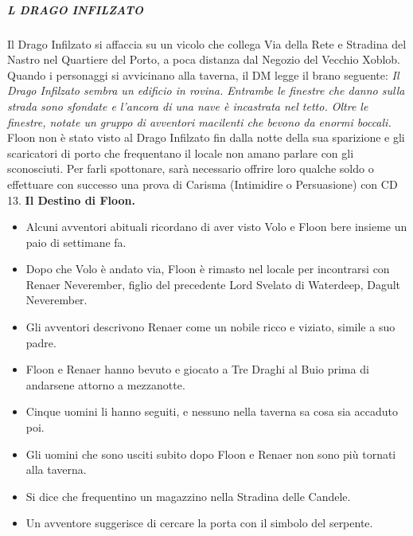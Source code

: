 \documentclass{article}
\begin{document}
                        \subparagraph{L DRAGO INFILZATO}
Il Drago Infilzato si affaccia su un vicolo che collega Via della Rete e Stradina del Nastro nel Quartiere del Porto, a poca distanza dal Negozio del Vecchio Xoblob. Quando i personaggi si avvicinano alla taverna, il DM legge il brano seguente:\newline
\textit{Il Drago Infilzato sembra un edificio in rovina. Entrambe le finestre che danno sulla strada sono sfondate e l'ancora di una nave è incastrata nel tetto. Oltre le finestre, notate un gruppo di avventori macilenti che bevono da enormi boccali.}\newline
Floon non è stato visto al Drago Infilzato fin dalla notte della sua sparizione e gli scaricatori di porto che frequentano il locale non amano parlare con gli sconosciuti. Per farli spottonare, sarà necessario offrire loro qualche soldo o effettuare con successo una prova di Carisma (Intimidire o Persuasione) con CD 13.\newline
\textbf{Il Destino di Floon.} \begin{itemize}
    \item Alcuni avventori abituali ricordano di aver visto Volo e Floon bere insieme un paio di settimane fa.
    \item Dopo che Volo è andato via, Floon è rimasto nel locale per incontrarsi con Renaer Neverember, figlio del precedente Lord Svelato di Waterdeep, Dagult Neverember.
    \item Gli avventori descrivono Renaer come un nobile ricco e viziato, simile a suo padre.
    \item Floon e Renaer hanno bevuto e giocato a Tre Draghi al Buio prima di andarsene attorno a mezzanotte.
    \item Cinque uomini li hanno seguiti, e nessuno nella taverna sa cosa sia accaduto poi.
    \item Gli uomini che sono usciti subito dopo Floon e Renaer non sono più tornati alla taverna.
    \item Si dice che frequentino un magazzino nella Stradina delle Candele.
    \item Un avventore suggerisce di cercare la porta con il simbolo del serpente.
\end{itemize}
\end{document}
